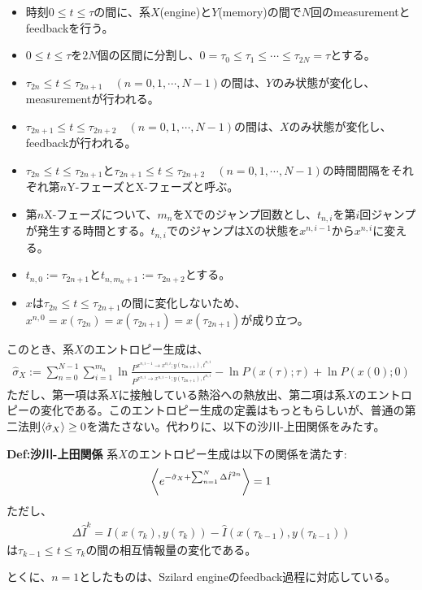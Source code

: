 \documentclass[a4paper,11pt]{jsarticle}
\numberwithin{equation}{section}
\begin{document}
\begin{itemize}
    \item 時刻$0 \leq t \leq \tau$の間に、系$X$(engine)と$Y$(memory)の間で$N$回のmeasurementとfeedbackを行う。
    \item $0 \leq t \leq \tau$を$2N$個の区間に分割し、$ 0 = \tau_0 \leq \tau_1 \leq \cdots \leq \tau_{2N} = \tau$とする。
    \item $\tau_{2n} \leq t \leq \tau_{2n+1}\quad(n=0,1,\cdots,N-1)$の間は、$Y$のみ状態が変化し、measurementが行われる。
    \item $\tau_{2n+1} \leq t \leq \tau_{2n+2}\quad(n=0,1,\cdots,N-1)$の間は、$X$のみ状態が変化し、feedbackが行われる。
    \item $\tau_{2n} \leq t \leq \tau_{2n+1}$と$\tau_{2n+1} \leq t \leq \tau_{2n+2}\quad(n=0,1,\cdots,N-1)$の時間間隔をそれぞれ第$n$Y-フェーズとX-フェーズと呼ぶ。
    \item 第$n$X-フェーズについて、$m_n$をXでのジャンプ回数とし、$t_{n,i}$を第$i$回ジャンプが発生する時間とする。$t_{n,i}$でのジャンプはXの状態を$x^{n,i-1}$から$x^{n,i}$に変える。
    \item $t_{n,0} := \tau_{2n+1}$と$t_{n,m_n+1} := \tau_{2n+2}$とする。
    \item $x$は$\tau_{2n} \leq t \leq \tau_{2n+1}$の間に変化しないため、$x^{n,0} = x(\tau_{2n}) = x(\tau_{2n+1}) = x(\tau_{2n+1})$が成り立つ。
\end{itemize}

このとき、系$X$のエントロピー生成は、
\begin{align}
    \hat{\sigma}_X := \sum^{N-1}_{n=0} \sum^{m_n}_{i=1} \ln \frac{P^{x^{n,i-1} \to x^{n,i}; y(\tau_{2n+1}), t^{n,i}}}{P^{x^{n,i} \to x^{n,i-1}; y(\tau_{2n+1}), t^{n,i}}} - \ln P(x(\tau); \tau) + \ln P(x(0); 0)
\end{align}
ただし、第一項は系$X$に接触している熱浴への熱放出、第二項は系$X$のエントロピーの変化である。このエントロピー生成の定義はもっともらしいが、普通の第二法則$\ev{\hat{\sigma}_X} \geq 0$を満たさない。代わりに、以下の沙川-上田関係をみたす。
\begin{itembox}[l]{\textbf{Def:沙川-上田関係}}
    系$X$のエントロピー生成は以下の関係を満たす:
    \begin{align}
        \ev{e^{-\hat{\sigma}_X+\sum_{n=1}^N\Delta \hat{I}^{2n} }} = 1 \label{eq:s-u}
    \end{align}
    ただし、
    \begin{align}
        \Delta \hat{I}^{k} = \hat{I}(x(\tau_{k}),y(\tau_{k})) - \hat{I}(x(\tau_{k-1}),y(\tau_{k-1}))
    \end{align}
    は$\tau_{k-1} \leq t \leq \tau_{k}$の間の相互情報量の変化である。
\end{itembox}
とくに、$n=1$としたものは、Szilard engineのfeedback過程に対応している。\\
\end{document}

